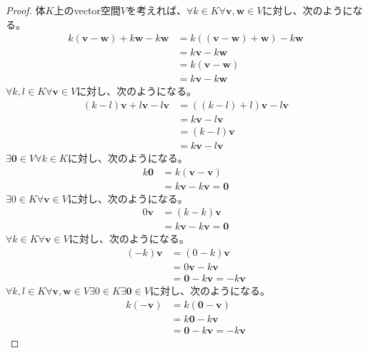 \documentclass[dvipdfmx]{jsarticle}
\begin{document}
\begin{proof}
体$K$上のvector空間$V$を考えれば、$\forall k \in K\forall\mathbf{v},\mathbf{w} \in V$に対し、次のようになる。
\begin{align*}
k\left( \mathbf{v}-\mathbf{w} \right) + k\mathbf{w} - k\mathbf{w}&=k\left( \left( \mathbf{v} - \mathbf{w} \right) + \mathbf{w} \right) - k\mathbf{w}\\
&=k\mathbf{v} - k\mathbf{w}\\
&=k\left( \mathbf{v}-\mathbf{w} \right)\\
&= k\mathbf{v} - k\mathbf{w}
\end{align*}
$\forall k,l \in K\forall\mathbf{v} \in V$に対し、次のようになる。
\begin{align*}
(k - l)\mathbf{v} + l\mathbf{v} - l\mathbf{v}&=\left( (k - l) + l \right)\mathbf{v} - l\mathbf{v}\\
&=k\mathbf{v} - l\mathbf{v}\\
&=(k - l)\mathbf{v}\\
&= k\mathbf{v} - l\mathbf{v}
\end{align*}
$\exists\mathbf{0} \in V\forall k \in K$に対し、次のようになる。
\begin{align*}
k\mathbf{0} &= k\left( \mathbf{v}-\mathbf{v} \right)\\
&= k\mathbf{v}-k\mathbf{v} = \mathbf{0}
\end{align*}
$\exists 0 \in K\forall\mathbf{v} \in V$に対し、次のようになる。
\begin{align*}
0\mathbf{v} &= (k - k)\mathbf{v}\\
&= k\mathbf{v} - k\mathbf{v} = \mathbf{0}
\end{align*}
$\forall k \in K\forall\mathbf{v} \in V$に対し、次のようになる。
\begin{align*}
( - k)\mathbf{v} &= (0 - k)\mathbf{v}\\
&= 0\mathbf{v} - k\mathbf{v}\\
&= \mathbf{0} - k\mathbf{v} = - k\mathbf{v}
\end{align*}
$\forall k,l \in K\forall\mathbf{v},\mathbf{w} \in V\exists 0 \in K\exists\mathbf{0} \in V$に対し、次のようになる。
\begin{align*}
k\left( - \mathbf{v} \right) &= k\left( \mathbf{0} - \mathbf{v} \right)\\
&= k\mathbf{0} - k\mathbf{v}\\
&= \mathbf{0} - k\mathbf{v} = - k\mathbf{v}
\end{align*}
\end{proof}
\end{document}
